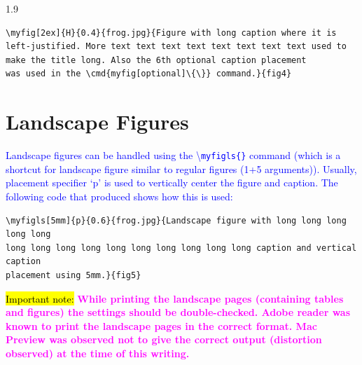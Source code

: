 \documentclass[phd]{ndsu-thesis-2022}
\newcommand\myspacing{1.9}      %
\newcommand\italk[1]{\textcolor{blue}{#1}}  %
\newcommand\cmd[1]{\textbackslash\texttt{#1}}  %
\begin{document}
\begin{spacing}{\myspacing}
{\singlespacing
\begin{verbatim}
\myfig[2ex]{H}{0.4}{frog.jpg}{Figure with long caption where it is 
left-justified. More text text text text text text text text used to 
make the title long. Also the 6th optional caption placement 
was used in the \cmd{myfig[optional]\{\}} command.}{fig4}
\end{verbatim}
}


\section{Landscape Figures}

\italk{Landscape figures can be handled using the \cmd{myfigls\{\}} command (which is a shortcut for landscape figure similar to regular figures (1+5 arguments)). Usually, placement specifier `p' is used to vertically center the figure and caption. The following code that produced \Cref{fig5} shows how this is used:}

\vspace{-4ex}
{\singlespace
\begin{verbatim}
\myfigls[5mm]{p}{0.6}{frog.jpg}{Landscape figure with long long long long long
long long long long long long long long long long caption and vertical caption
placement using 5mm.}{fig5}
\end{verbatim}
}

\italk{\hl{Important note:}} \textcolor{magenta}{\bfseries While printing the landscape pages (containing tables and figures) the settings should be double-checked. Adobe reader was known to print the landscape pages in the correct format. Mac Preview was observed not to give the correct output (distortion observed) at the time of this writing.}



\end{spacing}
\end{document}
